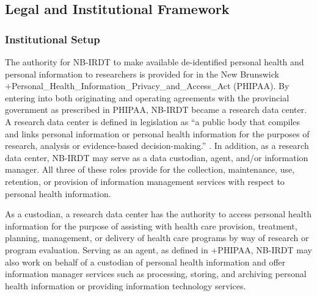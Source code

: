 \documentclass[
]{WileySix}
\begin{document}
\hypertarget{legal-and-institutional-framework-2}{%
\subsection{Legal and Institutional Framework}\label{legal-and-institutional-framework-2}}

\hypertarget{institutional-setup-2}{%
\subsubsection{Institutional Setup}\label{institutional-setup-2}}

The authority for NB-IRDT to make available de-identified personal health and personal information to researchers is provided for in the New Brunswick +Personal\_Health\_Information\_Privacy\_and\_Access\_Act\textbar{} (PHIPAA). By entering into both originating and operating agreements with the provincial government as prescribed in PHIPAA, NB-IRDT became a research data center. A research data center is defined in legislation as ``a public body that compiles and links personal information or personal health information for the purposes of research, analysis or evidence-based decision-making.'' \citep{governmentofnewbrunswick2009}. In addition, as a research data center, NB-IRDT may serve as a data custodian, agent, and/or information manager. All three of these roles provide for the collection, maintenance, use, retention, or provision of information management services with respect to personal health information.

As a custodian, a research data center has the authority to access personal health information for the purpose of assisting with health care provision, treatment, planning, management, or delivery of health care programs by way of research or program evaluation. Serving as an agent, as defined in +PHIPAA\textbar, NB-IRDT may also work on behalf of a custodian of personal health information and offer information manager services such as processing, storing, and archiving personal health information or providing information technology services.
\end{document}
